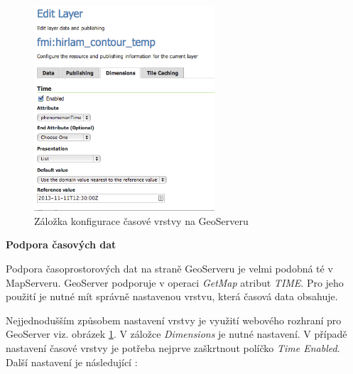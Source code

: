 \begin{figure}[h!]  \centering
\includegraphics[width=0.6\textwidth]{../img/geoserver-layer-edit.png}
	\caption{Záložka konfigurace časové vrstvy na GeoServeru
\cite{geoserver-layer-edit}}
	\label{fig:geoserver-layer-edit}
\end{figure}

\bigskip
\noindent

\textbf{Podpora časových dat}

Podpora časoprostorových dat na straně GeoServeru je velmi podobná té v
MapServeru. GeoServer podporuje v operaci \textit{GetMap} atribut
\textit{TIME}. Pro jeho použití je nutné mít správně nastavenou
vrstvu, která časová data obsahuje.

Nejjednodušším způsobem nastavení vrstvy je využití webového rozhraní
pro Geo\-Server viz. obrázek \ref{fig:geoserver-layer-edit}. V záložce \textit{Dimensions} je
nutné nastavení. V případě nastavení časové vrstvy je potřeba nejprve
zaškrtnout políčko \textit{Time Enabled}. Další nastavení je
následující \cite{geoserver-layer-edit}:

